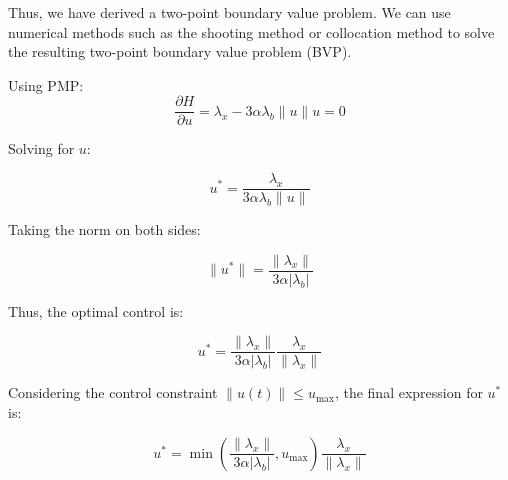 Thus, we have derived a two-point boundary value problem. We can use numerical methods such as the shooting method or collocation method to solve the resulting two-point boundary value problem (BVP).

Using PMP:
\begin{equation}
    \frac{\partial H}{\partial u} = \lambda_x - 3\alpha \lambda_b \|u\| u = 0
\end{equation}

Solving for \( u \):

\begin{equation}
    u^* = \frac{\lambda_x}{3\alpha \lambda_b \|u\|}
\end{equation}

Taking the norm on both sides:

\begin{equation}
    \|u^*\| = \frac{\|\lambda_x\|}{3\alpha |\lambda_b|}
\end{equation}

Thus, the optimal control is:

\begin{equation}
    u^* = \frac{\|\lambda_x\|}{3\alpha |\lambda_b|} \frac{\lambda_x}{\|\lambda_x\|}
\end{equation}

Considering the control constraint \( \|u(t)\| \leq u_{\max} \), the final expression for \( u^* \) is:

\begin{equation}
    u^* = \min\left(\frac{\|\lambda_x\|}{3\alpha |\lambda_b|}, u_{\max} \right) \frac{\lambda_x}{\|\lambda_x\|}
\end{equation}
